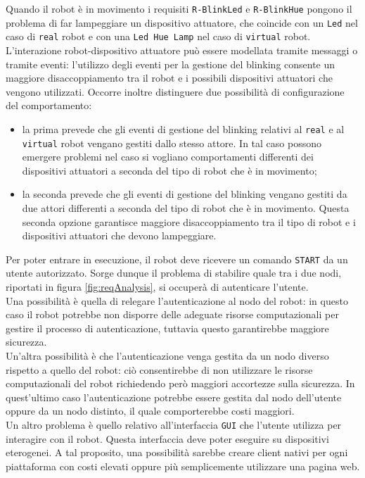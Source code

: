 \documentclass{llncs}
\newcommand{\action}[1]{\texttt{#1}\xspace}
\newcommand{\code}[1]{{\color{blue}\small{\texttt{#1}}}}
\newcommand{\fname}[1]{{\color{magenta}\small{\texttt{#1}}}}
\begin{document}
Quando il robot è in movimento i requisiti \code{R-BlinkLed} e \code{R-BlinkHue} pongono il problema di far lampeggiare un dispositivo attuatore, che coincide con un \action{Led} nel caso di \fname{real} robot e con una \action{Led Hue Lamp} nel caso di \fname{virtual} robot. \\
L'interazione robot-dispositivo attuatore può essere modellata tramite messaggi o tramite eventi: l'utilizzo degli eventi per la gestione del blinking consente un maggiore disaccoppiamento tra il robot e i possibili dispositivi attuatori che vengono utilizzati. 
Occorre inoltre distinguere due possibilità di configurazione del comportamento:
\begin{itemize}
	\setlength\itemsep{0em}
	\item la prima prevede che gli eventi di gestione del blinking relativi al \fname{real} e al \fname{virtual} robot vengano gestiti dallo stesso attore. In tal caso possono emergere problemi nel caso si vogliano comportamenti differenti dei dispositivi attuatori a seconda del tipo di robot che è in movimento;
	\item la seconda prevede che gli eventi di gestione del blinking vengano gestiti da due attori differenti a seconda del tipo di robot che è in movimento. Questa seconda opzione garantisce maggiore disaccoppiamento tra il tipo di robot e i dispositivi attuatori che devono lampeggiare.
\end{itemize}

Per poter entrare in esecuzione, il robot deve ricevere un comando \action{START} da un utente autorizzato. Sorge dunque il problema di stabilire quale tra i due nodi, riportati in figura \ref{fig:reqAnalysis}, si occuperà di autenticare l'utente. \\ Una possibilità è quella di relegare l'autenticazione al nodo del robot: in questo caso il robot potrebbe non disporre delle adeguate risorse computazionali per gestire il processo di autenticazione, tuttavia questo garantirebbe maggiore sicurezza. \\ Un'altra possibilità è che l'autenticazione venga gestita da un nodo diverso rispetto a quello del robot: ciò consentirebbe di non utilizzare le risorse computazionali del robot richiedendo però maggiori accortezze sulla sicurezza. In quest'ultimo caso l'autenticazione potrebbe essere gestita dal nodo dell'utente oppure da un nodo distinto, il quale comporterebbe costi maggiori. \\

Un altro problema è quello relativo all'interfaccia \action{GUI} che l'utente utilizza per interagire con il robot. Questa interfaccia deve poter eseguire su dispositivi eterogenei. A tal proposito, una possibilità sarebbe creare client nativi per ogni piattaforma con costi elevati oppure più semplicemente utilizzare una pagina web. 
\end{document}
